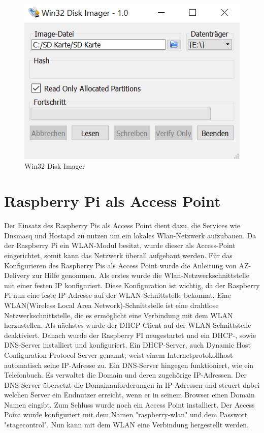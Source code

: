 \begin{figure}[H]
	\centering
	\includegraphics[width=0.5\linewidth]{images/Win32 Disk Imager.png}
	\caption[Win32 Disk Imager]{Win32 Disk Imager}
	\label{fig:Win32 Disk Imager}
\end{figure}

\newpage
\section{Raspberry Pi als Access Point} \label{RaspberryAccessPoint}
Der Einsatz des Raspberry Pis als Access Point dient dazu, die Services wie Dnsmasq und Hostapd zu nutzen um ein lokales Wlan-Netzwerk aufzubauen. Da der Raspberry Pi ein WLAN-Modul besitzt, wurde dieser als Access-Point eingerichtet, somit kann das Netzwerk überall aufgebaut werden.  
Für das Konfigurieren des Raspberry Pis als Access Point wurde die Anleitung von AZ-Delivery zur Hilfe genommen. Als erstes wurde die Wlan-Netzwerkschnittstelle mit einer festen IP konfiguriert. Diese Konfiguration ist wichtig, da der Raspberry Pi nun eine feste IP-Adresse auf der WLAN-Schnittstelle bekommt. Eine WLAN(Wireless Local Area Network)-Schnittstelle ist eine drahtlose Netzwerkschnittstelle, die es ermöglicht eine Verbindung mit dem WLAN herzustellen. Als nächstes wurde der DHCP-Client auf der WLAN-Schnittstelle deaktiviert. Danach wurde der Raspberry PI neugestartet und ein DHCP-, sowie DNS-Server installiert und konfiguriert. Ein DHCP-Server, auch Dynamic Host Configuration Protocol Server genannt, weist einem Internetprotokollhost automatisch seine IP-Adresse zu. Ein DNS-Server hingegen funktioniert, wie ein Telefonbuch. Es verwaltet die Domain und deren zugehörige IP-Adressen. Der DNS-Server übersetzt die Domainanforderungen in IP-Adressen und steuert dabei welchen Server ein Endnutzer erreicht, wenn er in seinem Browser einen Domain Namen eingibt.  Zum Schluss wurde noch ein Access Point installiert. Der Access Point wurde konfiguriert mit dem Namen "raspberry-wlan" und dem Passwort "stagecontrol". Nun kann mit dem WLAN eine Verbindung hergestellt werden. \parencite{RaspberryPiAccessPoint}

